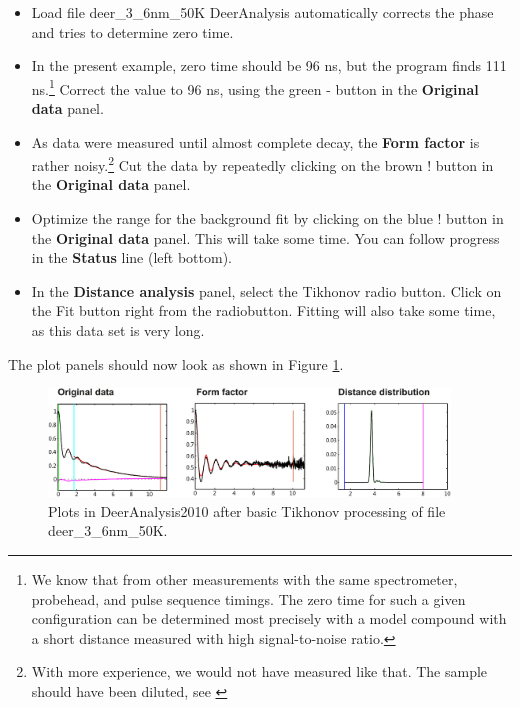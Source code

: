 \documentclass[11pt,a4paper]{article}
\begin{document}
\begin{itemize}
	\item Load file {\ttfamily deer\_3\_6nm\_50K} DeerAnalysis automatically corrects the phase and tries to determine zero time.
	\item In the present example, zero time should be 96 ns, but the program finds 111 ns.\footnote{We know that from other measurements with the same spectrometer, probehead, and pulse sequence timings. The zero time for such a given configuration can be determined most precisely with a model compound with a short distance measured with high signal-to-noise ratio.} Correct the value to 96 ns, using the green {\ttfamily -} button in the {\ttfamily \bf Original data} panel.
	\item As data were measured until almost complete decay, the {\ttfamily \bf Form factor} is rather noisy.\footnote{With more experience, we would not have measured like that. The sample should have been diluted, see \cite{jeschke2007}} Cut the data by repeatedly clicking on the brown {\ttfamily !} button in the {\ttfamily \bf Original data} panel.
	\item Optimize the range for the background fit by clicking on the blue {\ttfamily !} button in the {\ttfamily \bf Original data} panel. This will take some time. You can follow progress in the {\ttfamily \bf Status} line (left bottom).
	\item In the {\ttfamily \bf Distance analysis} panel, select the {\ttfamily Tikhonov} radio button. Click on the {\ttfamily Fit} button right from the radiobutton. Fitting will also take some time, as this data set is very long.
\end{itemize}

The plot panels should now look as shown in Figure \ref{fig:1}.

\begin{figure}[ht]
 \vspace{10mm}
 	\begin{center}
		\includegraphics[width=0.95\textwidth]{figure1.pdf}
	\end{center}
	\caption{Plots in DeerAnalysis2010 after basic Tikhonov processing of file {\ttfamily deer\_3\_6nm\_50K}.}
	\label{fig:1}
\end{figure}
\end{document}
